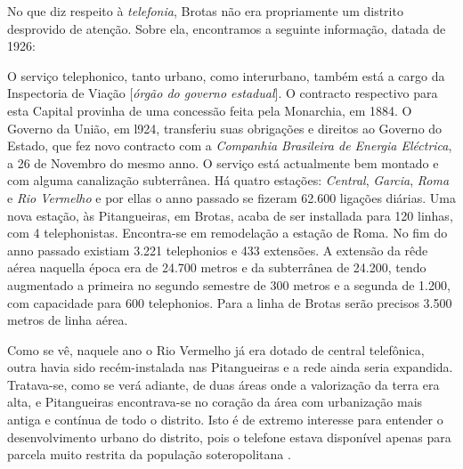 No que diz respeito à \textit{telefonia}, Brotas não era propriamente um distrito desprovido de atenção. Sobre ela, encontramos a seguinte informação, datada de 1926:

\begin{citacao}
O serviço telephonico, tanto urbano, como interurbano, também está a cargo da Inspectoria de Viação [\textit{órgão do governo estadual}].
O contracto respectivo para esta Capital provinha de uma concessão feita pela Monarchia, em 1884.
O Governo da União, em l924, transferiu suas obrigações e direitos ao Governo do Estado, que fez novo contracto com a \textit{Companhia Brasileira de Energia Eléctrica}, a 26 de Novembro do mesmo anno.
O serviço está actualmente bem montado e com alguma canalização subterrânea.
Há quatro estações: \textit{Central}, \textit{Garcia}, \textit{Roma} e \textit{Rio Vermelho} e por ellas o anno passado se fizeram 62.600 ligações diárias.
Uma nova estação, às Pitangueiras, em Brotas, acaba de ser installada para 120 linhas, com 4 telephonistas.
Encontra-se em remodelação a estação de Roma.
No fim do anno passado existiam 3.221 telephonios e 433 extensões.
A extensão da rêde aérea naquella época era de 24.700 metros e da subterrânea de 24.200, tendo augmentado a primeira no segundo semestre de 300 metros e a segunda
de 1.200, com capacidade para 600 telephonios.
Para a linha de Brotas serão precisos 3.500 metros de linha aérea. \cite[pp.~266-267]{bahia_rpe_1926}
\end{citacao}

Como se vê, naquele ano o Rio Vermelho já era dotado de central telefônica, outra havia sido recém-instalada nas Pitangueiras e a rede ainda seria expandida. Tratava-se, como se verá adiante, de duas áreas onde a valorização da terra era alta, e Pitangueiras encontrava-se no coração da área com urbanização mais antiga e contínua de todo o distrito. Isto é de extremo interesse para entender o desenvolvimento urbano do distrito, pois o telefone estava disponível apenas para parcela muito restrita da população soteropolitana \cite[pp.~256-257]{SAMPAIO2005}.

